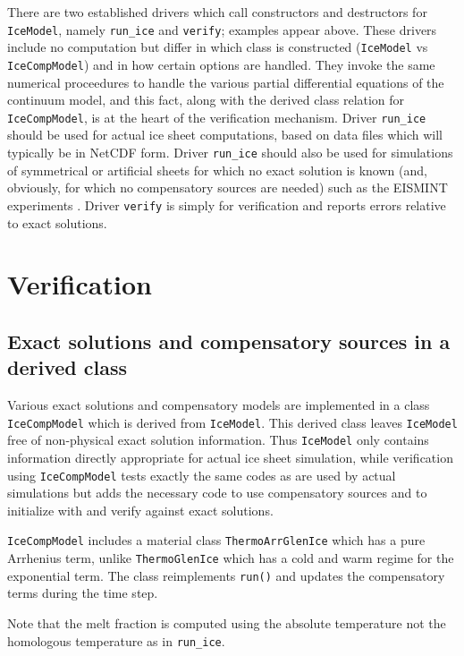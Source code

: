 \documentclass[11pt,final]{amsart}
\renewcommand{\t}[1]{\texttt{#1}}
\begin{document}
There are two established drivers which call constructors and destructors for \t{IceModel}, namely \verb|run_ice| and \verb|verify|; examples appear above.  These drivers include no computation but differ in which class is constructed (\t{IceModel} vs \t{IceCompModel}) and in how certain options are handled.  They invoke the same numerical proceedures to handle the various partial differential equations of the continuum model, and this fact, along with the derived class relation for \t{IceCompModel}, is at the heart of the verification mechanism.  Driver \verb|run_ice| should be used for actual ice sheet computations, based on data files which will typically be in NetCDF form.  Driver \verb|run_ice| should also be used for simulations of symmetrical or artificial sheets for which no exact solution is known (and, obviously, for which no compensatory sources are needed) such as the EISMINT experiments \cite{EISMINT96,EISMINT00}.  Driver \verb|verify| is simply for verification and reports errors relative to exact solutions.



\section{Verification}

\subsection{Exact solutions and compensatory sources in a derived class}  Various exact solutions and compensatory models are implemented in a class \t{IceCompModel} which is derived from \t{IceModel}.  This derived class leaves \t{IceModel} free of non-physical exact solution information.  Thus \t{IceModel} only contains information directly appropriate for actual ice sheet simulation, while verification using \t{IceCompModel} tests exactly the same codes as are used by actual simulations but adds the necessary code to use compensatory sources and to initialize with and verify against exact solutions.

\t{IceCompModel} includes a material class \t{ThermoArrGlenIce} which has a pure Arrhenius term, unlike \t{ThermoGlenIce} which has a cold and warm regime for the exponential term.  The class reimplements \t{run()} and updates the compensatory terms during the time step.

Note that the melt fraction is computed using the absolute temperature not the homologous temperature as in \verb|run_ice|.
\end{document}

